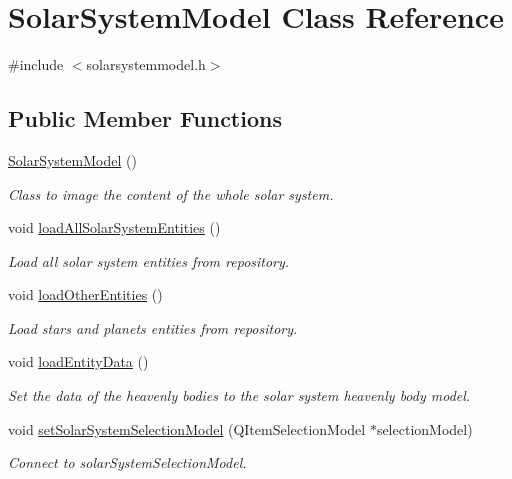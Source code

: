 \hypertarget{classSolarSystemModel}{
\section{\-Solar\-System\-Model \-Class \-Reference}
\label{db/da1/classSolarSystemModel}
}


{\ttfamily \#include $<$solarsystemmodel.\-h$>$}

\subsection*{\-Public \-Member \-Functions}
\begin{DoxyCompactItemize}
\item 
\hyperlink{classSolarSystemModel_afaa0a3a394f61a55606cd2c7c7aaf9c5}{\-Solar\-System\-Model} ()
\begin{DoxyCompactList}\small\item\em \-Class to image the content of the whole solar system. \end{DoxyCompactList}\item 
void \hyperlink{classSolarSystemModel_a56492416712dfd3a2fd22dc211258393}{load\-All\-Solar\-System\-Entities} ()
\begin{DoxyCompactList}\small\item\em \-Load all solar system entities from repository. \end{DoxyCompactList}\item 
void \hyperlink{classSolarSystemModel_a0d8ae9f49753e347f8eef4e0c7153872}{load\-Other\-Entities} ()
\begin{DoxyCompactList}\small\item\em \-Load stars and planets entities from repository. \end{DoxyCompactList}\item 
void \hyperlink{classSolarSystemModel_a4d83bccf2fd4daa156ac2d71b0adbfcd}{load\-Entity\-Data} ()
\begin{DoxyCompactList}\small\item\em \-Set the data of the heavenly bodies to the solar system heavenly body model. \end{DoxyCompactList}\item 
void \hyperlink{classSolarSystemModel_ac8d3b318c5820a6fb085418312eb9eff}{set\-Solar\-System\-Selection\-Model} (\-Q\-Item\-Selection\-Model $\ast$selection\-Model)
\begin{DoxyCompactList}\small\item\em \-Connect to solar\-System\-Selection\-Model. \end{DoxyCompactList}\item 

\end{DoxyCompactItemize}
